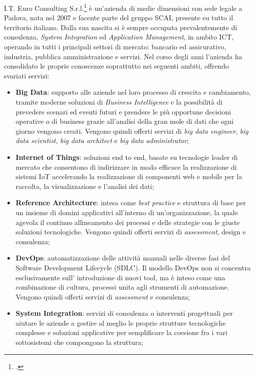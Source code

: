 I.T. Euro Consulting S.r.l.\footcite{https://www.itecons.it} è un'azienda di medie dimensioni con sede legale a Padova, nata nel 2007 e facente parte del gruppo SCAI, presente su tutto il territorio italiano. 
Dalla sua nascita si è sempre occupata prevalentemente di consulenza, \textit{System Integration} ed \textit{Application Management}, in ambito ICT, operando in tutti i principali settori di mercato: bancario ed assicurativo, industria, pubblica amministrazione e servizi.
Nel corso degli anni l'azienda ha consolidato le proprie conoscenze soprattutto nei seguenti ambiti, offrendo svariati servizi:
\begin{itemize}
	\item \textbf{Big Data}: supporto alle aziende nel loro processo di crescita e cambiamento, tramite moderne soluzioni di \textit{Business Intelligence} e la possibilità di prevedere scenari ed eventi futuri e prendere le più opportune decisioni operative o di business grazie all'analisi della gran mole di dati che ogni giorno vengono creati. Vengono quindi offerti servizi di \textit{big data engineer}, \textit{big data scientist}, \textit{big data architect} e \textit{big data administrator};
	\item \textbf{Internet of Things}: soluzioni end to end, basate su tecnologie leader di mercato che consentono di indirizzare in modo efficace la realizzazione di sistemi IoT accelerando la realizzazione di componenti web e mobile per la raccolta, la visualizzazione e l’analisi dei dati;
	\item \textbf{Reference Architecture}: intesa come \textit{best practice} e struttura di base per un insieme di domini applicativi all’interno di un’organizzazione, la quale agevola il continuo allineamento dei processi e delle strategie con le giuste soluzioni tecnologiche. Vengono quindi offerti servizi di \textit{assessment}, design e consulenza;
	\item \textbf{DevOps}: automatizzazione delle attività manuali nelle diverse fasi del \gls{Software Development Lifecycle (SDLC)}. Il modello DevOps non si concentra esclusivamente sull’ introduzione di nuovi tool, ma è inteso come una combinazione di cultura, processi unita agli strumenti di automazione. Vengono quindi offerti servizi di \textit{assessment} e consulenza; 
	\item \textbf{System Integration}: servizi di consulenza o interventi progettuali per aiutare le aziende a gestire al meglio le proprie strutture tecnologiche complesse e soluzioni applicative per semplificare la coesione fra i vari sottosistemi che compongono la struttura;

\end{itemize}
